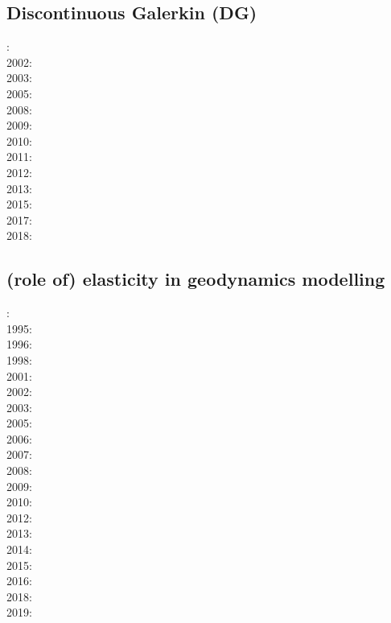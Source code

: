 \subsection*{Discontinuous Galerkin (DG)}

: \cite{coks00}\\
2002: \cite{cacp02}\cite{coks02}\\
2003: \cite{cock03}\\
2005: \cite{cacs05}\cite{coks05}\\
2008: \cite{kans08}\cite{mofh08}\cite{dole08}\\
2009: \cite{coks09}\cite{cogo09}\\
2010: \cite{ngpc10}\cite{conp10}\cite{mofp10}\\
2011: \cite{geor11}\cite{ngpc11}\\
2012: \cite{kauf12}\cite{ngpe12}\cite[chapt. 31]{lomw12}\\
2013: \cite{vyrc13}\\
2015: \cite{lelk15} \\
2017: \cite{fewk17}\cite{iglo17}\cite{hepb17}\\
2018: \cite{puth18}


\subsection*{(role of) elasticity in geodynamics modelling}

:\cite{yusa84}\\
1995:\cite{budi95}\\
1996:\cite{hach96}\\
1998:\cite{copo98}\\
2001:\cite{vapy01}\\
2002:\cite{mumh02}\cite{modm02}\\
2003:\cite{hukm03}\cite{wabu03}\\
2005:\cite{mure05}\\
2006:\cite{kapo06}\cite{mudm06}\\
2007:\cite{kabe07}\\
2008:\cite{baso08}\cite{fukk08}\\
2009:\cite{qurj09}\\
2010:\cite{bepo10}\\
2012:\cite{gerb12}\\
2013:\cite{wahd13}\\
2014:\cite{famc14}\cite{fogm14}\\
2015:\cite{thkp15}\\
2016:\cite{bafl16}\cite{jads16}\cite{olbm16}\cite{bafl16}\\
2018:\cite{dusd18}\\
2019:\cite{pact19}

